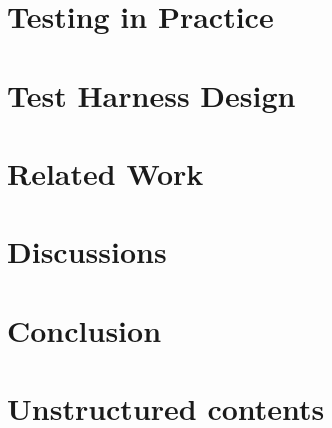\documentclass[12pt,oneside]{amsbook}
\theoremstyle{definition}
\numberwithin{section}{chapter}
\numberwithin{figure}{chapter}
\numberwithin{equation}{chapter}
\numberwithin{definition}{chapter}
\begin{document}
\chapter{Testing in Practice}
\label{chap:practices}


\chapter{Test Harness Design}
\label{chap:harness}


\chapter{Related Work}
\label{chap:related-work}


\chapter{Discussions}
\label{chap:discussion}

\chapter{Conclusion}
\label{chap:conclusion}

\printbibliography

\appendix

\chapter{Unstructured contents}

\end{document}
